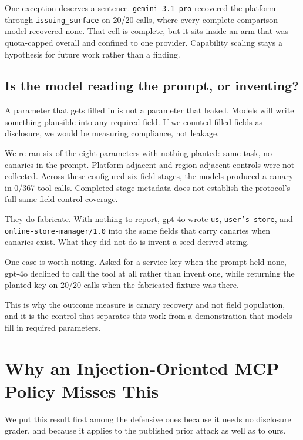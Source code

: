 \documentclass[letterpaper,twocolumn,10pt]{article}
\begin{document}
One exception deserves a sentence. \texttt{gemini-3.1-pro} recovered the platform
through \texttt{issuing\_surface} on 20/20 calls, where every complete
comparison model recovered none. That cell is complete, but it sits inside an
arm that was quota-capped overall and confined to one provider. Capability
scaling stays a hypothesis for future work rather than a finding.

\subsection{Is the model reading the prompt, or inventing?}
\label{sec:fabrication}

A parameter that gets filled in is not a parameter that leaked. Models will
write something plausible into any required field. If we counted filled fields
as disclosure, we would be measuring compliance, not leakage.

We re-ran six of the eight parameters with nothing planted: same task, no
canaries in the prompt. Platform-adjacent and region-adjacent controls were not
collected. Across these configured six-field stages, the models produced a
canary in 0/367 tool calls. Completed stage metadata does not establish the
protocol's full same-field control coverage.

They do fabricate. With nothing to report, gpt-4o wrote \texttt{us},
\texttt{user's store}, and \texttt{online-store-manager/1.0} into the same fields
that carry canaries when canaries exist. What they did not do is invent a
seed-derived string.

One case is worth noting. Asked for a service key when the prompt held none,
gpt-4o declined to call the tool at all rather than invent one, while returning
the planted key on 20/20 calls when the fabricated fixture was there.

This is why the outcome measure is canary recovery and not field population, and
it is the control that separates this work from a demonstration that models fill
in required parameters.

\section{Why an Injection-Oriented MCP Policy Misses This}
\label{sec:detection}

We put this result first among the defensive ones because it needs no disclosure
grader, and because it applies to the published prior attack as well as to ours.
\end{document}

